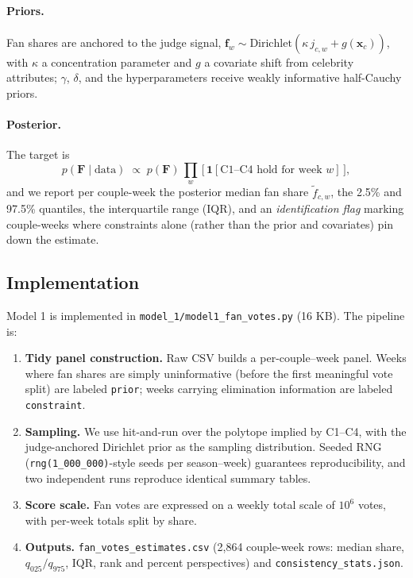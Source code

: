 \documentclass[11pt]{article}
\begin{document}
\paragraph{Priors.} Fan shares are anchored to the judge signal, $\mathbf{f}_w \sim
\text{Dirichlet}(\kappa\, j_{c,w} + g(\mathbf{x}_c))$, with $\kappa$ a concentration
parameter and $g$ a covariate shift from celebrity attributes; $\gamma$, $\delta$, and the
hyperparameters receive weakly informative half-Cauchy priors.

\paragraph{Posterior.} The target is
\begin{equation}
p(\mathbf{F} \mid \text{data}) \;\propto\;
p(\mathbf{F})\,\prod_{w}\,
\big[\, \mathbf{1}[\text{C1--C4 hold for week } w] \,\big],
\end{equation}
and we report per couple-week the posterior median fan share $\tilde f_{c,w}$, the 2.5\%
and 97.5\% quantiles, the interquartile range (IQR), and an \emph{identification flag}
marking couple-weeks where constraints alone (rather than the prior and covariates) pin
down the estimate.

\subsection{Implementation}

Model 1 is implemented in \texttt{model\_1/model1\_fan\_votes.py} (16 KB). The pipeline is:
\begin{enumerate}
\item \textbf{Tidy panel construction.} Raw CSV builds a per-couple--week panel. Weeks
where fan shares are simply uninformative (before the first meaningful vote split) are
labeled \texttt{prior}; weeks carrying elimination information are labeled
\texttt{constraint}.
\item \textbf{Sampling.} We use hit-and-run over the polytope implied by C1--C4, with the
judge-anchored Dirichlet prior as the sampling distribution. Seeded RNG
(\texttt{rng(1\_000\_000)}-style seeds per season--week) guarantees reproducibility, and
two independent runs reproduce identical summary tables.
\item \textbf{Score scale.} Fan votes are expressed on a weekly total scale of
$10^6$ votes, with per-week totals split by share.
\item \textbf{Outputs.} \texttt{fan\_votes\_estimates.csv} (2{,}864 couple-week rows:
median share, $q_{025}/q_{975}$, IQR, rank and percent perspectives) and
\texttt{consistency\_stats.json}.
\end{enumerate}
\end{document}
